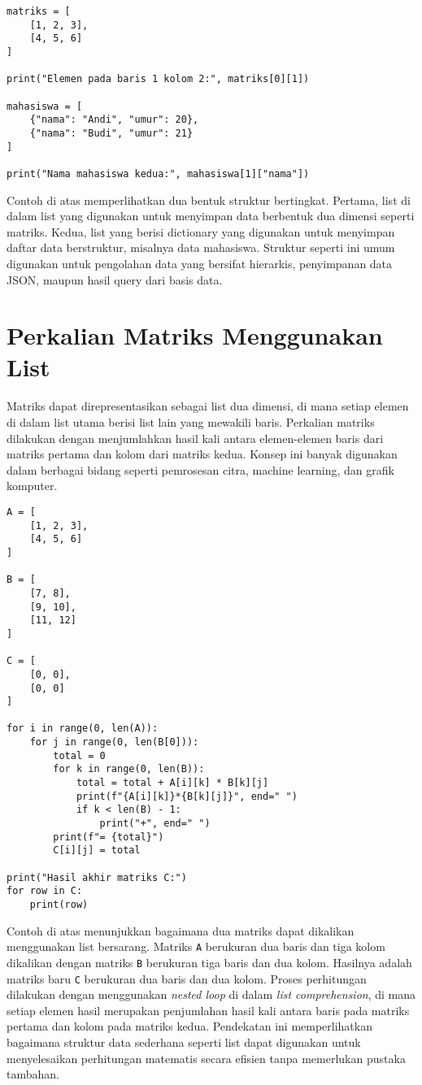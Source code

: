 \begin{lstlisting}[style=PythonStyle]
matriks = [
    [1, 2, 3],
    [4, 5, 6]
]

print("Elemen pada baris 1 kolom 2:", matriks[0][1])

mahasiswa = [
    {"nama": "Andi", "umur": 20},
    {"nama": "Budi", "umur": 21}
]

print("Nama mahasiswa kedua:", mahasiswa[1]["nama"])
\end{lstlisting}

Contoh di atas memperlihatkan dua bentuk struktur bertingkat. 
Pertama, list di dalam list yang digunakan untuk menyimpan data berbentuk dua dimensi seperti matriks. 
Kedua, list yang berisi dictionary yang digunakan untuk menyimpan daftar data berstruktur, misalnya data mahasiswa. 
Struktur seperti ini umum digunakan untuk pengolahan data yang bersifat hierarkis, penyimpanan data JSON, maupun hasil query dari basis data.

\section{Perkalian Matriks Menggunakan List}
Matriks dapat direpresentasikan sebagai list dua dimensi, di mana setiap elemen di dalam list utama berisi list lain yang mewakili baris. 
Perkalian matriks dilakukan dengan menjumlahkan hasil kali antara elemen-elemen baris dari matriks pertama dan kolom dari matriks kedua. 
Konsep ini banyak digunakan dalam berbagai bidang seperti pemrosesan citra, machine learning, dan grafik komputer.

\begin{lstlisting}[style=PythonStyle]
A = [
    [1, 2, 3],
    [4, 5, 6]
]

B = [
    [7, 8],
    [9, 10],
    [11, 12]
]

C = [
    [0, 0],
    [0, 0]
]

for i in range(0, len(A)):
    for j in range(0, len(B[0])):
        total = 0
        for k in range(0, len(B)):
            total = total + A[i][k] * B[k][j]
            print(f"{A[i][k]}*{B[k][j]}", end=" ")
            if k < len(B) - 1:
                print("+", end=" ")
        print(f"= {total}")
        C[i][j] = total

print("Hasil akhir matriks C:")
for row in C:
    print(row)
\end{lstlisting}

Contoh di atas menunjukkan bagaimana dua matriks dapat dikalikan menggunakan list bersarang. 
Matriks \texttt{A} berukuran dua baris dan tiga kolom dikalikan dengan matriks \texttt{B} berukuran tiga baris dan dua kolom. 
Hasilnya adalah matriks baru \texttt{C} berukuran dua baris dan dua kolom. 
Proses perhitungan dilakukan dengan menggunakan \textit{nested loop} di dalam \textit{list comprehension}, 
di mana setiap elemen hasil merupakan penjumlahan hasil kali antara baris pada matriks pertama dan kolom pada matriks kedua. 
Pendekatan ini memperlihatkan bagaimana struktur data sederhana seperti list dapat digunakan untuk menyelesaikan perhitungan matematis secara efisien tanpa memerlukan pustaka tambahan.

